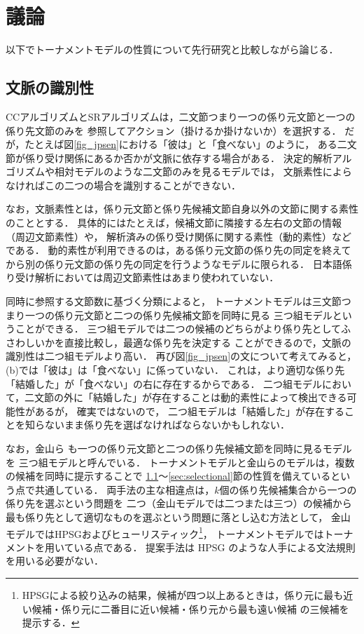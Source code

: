 \documentclass[japanese]{jnlp_1.4}
\begin{document}
\section{議論}

以下でトーナメントモデルの性質について先行研究と比較しながら論じる．

\subsection{文脈の識別性}
\label{sec:context}

CCアルゴリズムとSRアルゴリズムは，二文節つまり一つの係り元文節と一つの係り先文節のみを
参照してアクション（掛けるか掛けないか）を選択する．
だが，たとえば図\ref{fig_jpsen}における「彼は」と「食べない」のように，
ある二文節が係り受け関係にあるか否かが文脈に依存する場合がある．
決定的解析アルゴリズムや相対モデルのような二文節のみを見るモデルでは，
文脈素性によらなければこの二つの場合を識別することができない．

なお，文脈素性とは，係り元文節と係り先候補文節自身以外の文節に関する素性のこととする．
具体的にはたとえば，候補文節に隣接する左右の文節の情報（周辺文節素性）や，
解析済みの係り受け関係に関する素性（動的素性）などである．
動的素性が利用できるのは，ある係り元文節の係り先の同定を終えてから別の係り元文節の係り先の同定を行うようなモデルに限られる．
日本語係り受け解析においては周辺文節素性はあまり使われていない．


同時に参照する文節数に基づく分類によると，
トーナメントモデルは三文節つまり一つの係り元文節と二つの係り先候補文節を同時に見る
三つ組モデルということができる．
三つ組モデルでは二つの候補のどちらがより係り先としてふさわしいかを直接比較し，最適な係り先を決定する
ことができるので，文脈の識別性は二つ組モデルより高い．
再び図\ref{fig_jpsen}の文について考えてみると，(b)では「彼は」は「食べない」に係っていない．
これは，より適切な係り先「結婚した」が「食べない」の右に存在するからである．
二つ組モデルにおいて，二文節の外に「結婚した」が存在することは動的素性によって検出できる可能性があるが，
確実ではないので，
二つ組モデルは「結婚した」が存在することを知らないまま係り先を選ばなければならないかもしれない．

なお，金山ら \cite{Kanayama:2000} も一つの係り元文節と二つの係り先候補文節を同時に見るモデルを
三つ組モデルと呼んでいる．
トーナメントモデルと金山らのモデルは，複数の候補を同時に提示することで
\ref{sec:context}〜\ref{sec:selectional}節の性質を備えているという点で共通している．
両手法の主な相違点は，$k$個の係り先候補集合から一つの係り先を選ぶという問題を
二つ（金山モデルでは二つまたは三つ）の候補から最も係り先として適切なものを選ぶという問題に落とし込む方法として，
金山モデルではHPSGおよびヒューリスティック\footnote{
	HPSGによる絞り込みの結果，候補が四つ以上あるときは，係り元に最も近い候補・係り元に二番目に近い候補・係り元から最も遠い候補 の三候補を提示する．}，
トーナメントモデルではトーナメントを用いている点である．
提案手法は HPSG のような人手による文法規則を用いる必要がない．
\end{document}

